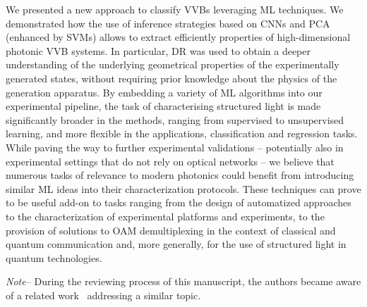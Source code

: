 We presented a new approach to classify \acp{VVB} leveraging ML techniques. We demonstrated how the use of inference strategies based on CNNs and PCA (enhanced by SVMs) allows to extract efficiently properties of high-dimensional photonic \ac{VVB} systems.
In particular, DR was used to obtain a deeper understanding of the underlying geometrical properties of the experimentally generated states, without requiring prior knowledge about the physics of the generation apparatus.
By embedding a variety of {\ac{ML}} algorithms into our experimental pipeline, the task of characterising structured light is made significantly broader in the methods, ranging from supervised to unsupervised learning, and more flexible in the applications, classification and regression tasks.
%
% 
While paving the way to further experimental validations -- potentially also in experimental settings that do not rely on optical networks -- we believe that numerous tasks of relevance to modern photonics could benefit from introducing similar {\ac{ML}} ideas into their characterization protocols. These techniques can prove to be useful add-on to tasks ranging from the design of automatized approaches to the characterization of experimental platforms and experiments, to the provision of solutions to OAM demultiplexing in the context of classical and quantum communication and, more generally, for the use of structured light in quantum technologies.

\textit{Note--} During the reviewing process of this manuscript, the authors
became aware of a related work~\cite{liu2019superhighresolution} addressing a similar topic.
